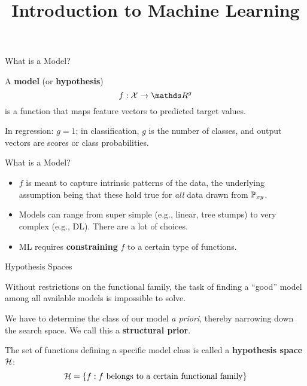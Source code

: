 \documentclass[11pt,compress,t,notes=noshow, xcolor=table]{beamer}
\title{Introduction to Machine Learning}
\begin{document}


\begin{framei}{What is a Model?}
\item A \textbf{model} (or \textbf{hypothesis}) 
$$
f : \Xspace \rightarrow \R^g
$$ 
is a function that maps feature vectors to predicted target values.
\item In regression: $g = 1$; in classification, $g$ is the number of classes, and output vectors are scores or class probabilities.
\end{framei}


\begin{frame}{What is a Model?}
\begin{itemize}
  \item $f$ is meant to capture intrinsic patterns of the data, the
  underlying assumption being that these hold true for \emph{all} data drawn from $\mathbb{P}_{xy}$.
  \item Models can range from super simple (e.g., linear, tree stumps) to very complex (e.g., DL). There are a lot of choices.
\end{itemize}
{
}
\begin{itemize}
  \item ML requires \textbf{constraining} $f$ to a certain type of functions.
\end{itemize}
\end{frame}


\begin{framei}{Hypothesis Spaces}
\item Without restrictions on the functional family, the task of finding a \enquote{good} model among all available models is impossible to solve.
\item We have to determine the class of our model \emph{a priori}, thereby narrowing down the search space. We call this a \textbf{structural prior}.
\item The set of functions defining a specific model class is called a 
\textbf{hypothesis space} $\mathcal{H}$:
$$\mathcal{H} = \{f: f \text{ belongs to a certain functional family}\}$$
\end{framei}
\end{document}
